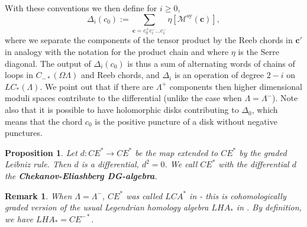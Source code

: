 \documentclass{gtpart}
\newtheorem{prop}[thm]{Proposition}
\newtheorem{rem}[thm]{Remark}
\newcommand{\sy}{\mathrm{sy}}
\begin{document}
With these conventions we then define for $i \geq 0$,  
\[ 
\Delta_i(c_0) := \sum_{\mathbf{c}=c_0^{+}c_i^{-}\dots c_1^{-}} \eta[\mathcal{M}^{\sy}(\mathbf{c})],
\] 
where we separate the components of the tensor product by the Reeb chords in $\mathbf{c}'$ in analogy with the notation for the product chain and where $\eta$ is the Serre diagonal. The output of $\Delta_{i}(c_{0})$ is thus a sum of alternating words of chains of loops in $C_{-\ast}(\Omega\Lambda)$ and Reeb chords, and   
$\Delta_{i}$ is an operation of degree $2-i$ on $LC_*(\Lambda)$. We point out that if there are $\Lambda^+$ components then higher dimensional moduli spaces contribute to
the differential (unlike the case when $\Lambda = \Lambda^-$). 
Note also that it is possible to have holomorphic disks contributing to $\Delta_0$, which means that the chord $c_0$ is the positive puncture of a disk without negative punctures.  

\begin{prop} 
    Let $d\colon CE^{\ast} \to CE^{\ast}$ be the map extended to $CE^*$ by the graded
Leibniz rule. 
Then $d$ is a differential, $d^{2}=0$. We call $CE^{\ast}$ with the differential $d$
the {\bf Chekanov-Eliashberg DG-algebra}. 
\end{prop}

\begin{rem}
    When $\Lambda=\Lambda^{-}$, $CE^*$ was called $LCA^*$ in \cite{EtLe} - this is cohomologically graded version of the usual Legendrian homology algebra $LHA_*$ in \cite{BEE}. By definition, we have $LHA_*= CE^{-*}$. 
\end{rem}
\end{document}
